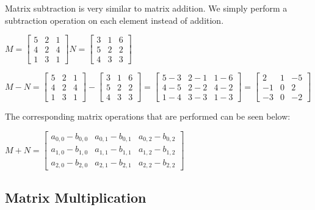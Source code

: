 \documentclass[12pt]{article}
\begin{document}
Matrix subtraction is very similar to matrix addition. We simply perform a subtraction operation on each element instead of addition.
\begin{center}
$M = \begin{bmatrix} 5 & 2 & 1 \\ 4 & 2 & 4 \\ 1 & 3 & 1 \end{bmatrix}
  N = \begin{bmatrix} 3 & 1 & 6 \\ 5 & 2 & 2 \\ 4 & 3 & 3 \end{bmatrix}
$
\end{center}
\begin{center}
$M - N =
 \begin{bmatrix} 5 & 2 & 1 \\ 4 & 2 & 4 \\ 1 & 3 & 1 \end{bmatrix}  -
  \begin{bmatrix} 3 & 1 & 6 \\  5 & 2 & 2 \\ 4 & 3 & 3 \end{bmatrix} = 
  \begin{bmatrix} 5 - 3 & 2 - 1 & 1 - 6 \\ 4 - 5 & 2 - 2 & 4 - 2 \\ 1 - 4 & 3 - 3 & 1 - 3 \end{bmatrix} =
  \begin{bmatrix} 2 & 1 & -5 \\ -1 & 0 & 2 \\ -3 & 0 & -2 \end{bmatrix}
$
\end{center}
The corresponding matrix operations that are performed can be seen below:
\begin{center}
$M + N =
 \begin{bmatrix} a_{0, 0} - b_{0, 0} & a_{0, 1} - b_{0, 1} & a_{0, 2} - b_{0, 2} \\
 		         a_{1, 0} - b_{1, 0} & a_{1, 1} - b_{1, 1} & a_{1, 2} - b_{1, 2} \\
		         a_{2, 0} - b_{2, 0} & a_{2, 1} - b_{2, 1} & a_{2, 2} - b_{2, 2}
 \end{bmatrix}
$
\end{center}

\subsection{Matrix Multiplication}
\end{document}
